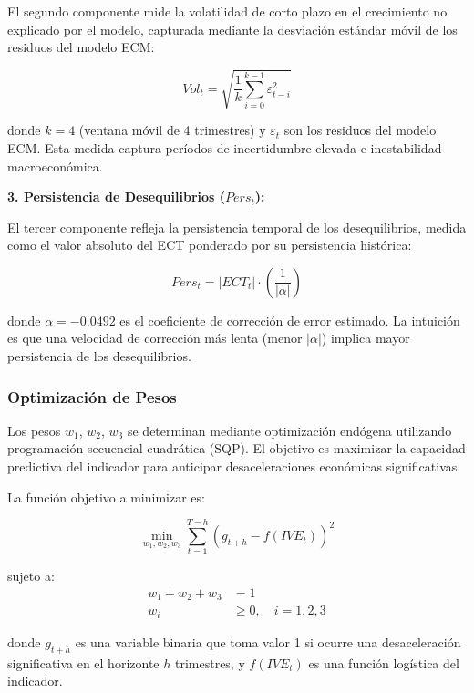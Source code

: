 \documentclass[3p,11pt]{elsarticle}
\begin{document}
El segundo componente mide la volatilidad de corto plazo en el crecimiento no explicado por el modelo, capturada mediante la desviación estándar móvil de los residuos del modelo ECM:

\begin{equation}
Vol_t = \sqrt{\frac{1}{k} \sum_{i=0}^{k-1} \varepsilon_{t-i}^2}
\label{eq:volatilidad}
\end{equation}

donde $k = 4$ (ventana móvil de 4 trimestres) y $\varepsilon_t$ son los residuos del modelo ECM. Esta medida captura períodos de incertidumbre elevada e inestabilidad macroeconómica.

\textbf{3. Persistencia de Desequilibrios ($Pers_t$):}

El tercer componente refleja la persistencia temporal de los desequilibrios, medida como el valor absoluto del ECT ponderado por su persistencia histórica:

\begin{equation}
Pers_t = |ECT_t| \cdot \left(\frac{1}{|\alpha|}\right)
\label{eq:persistencia}
\end{equation}

donde $\alpha = -0.0492$ es el coeficiente de corrección de error estimado. La intuición es que una velocidad de corrección más lenta (menor $|\alpha|$) implica mayor persistencia de los desequilibrios.

\subsubsection{Optimización de Pesos}

Los pesos $w_1$, $w_2$, $w_3$ se determinan mediante optimización endógena utilizando programación secuencial cuadrática (SQP). El objetivo es maximizar la capacidad predictiva del indicador para anticipar desaceleraciones económicas significativas.

La función objetivo a minimizar es:

\begin{equation}
\min_{w_1,w_2,w_3} \sum_{t=1}^{T-h} \left(g_{t+h} - f(IVE_t)\right)^2
\label{eq:optimizacion}
\end{equation}

sujeto a:
\begin{align}
w_1 + w_2 + w_3 &= 1 \\
w_i &\geq 0, \quad i = 1,2,3
\end{align}

donde $g_{t+h}$ es una variable binaria que toma valor 1 si ocurre una desaceleración significativa en el horizonte $h$ trimestres, y $f(IVE_t)$ es una función logística del indicador.
\end{document}
